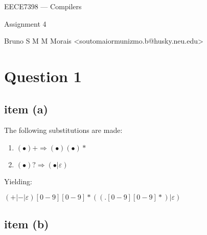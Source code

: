 \documentclass[10pt]{article}
\begin{document}
\begin{center}
\huge EECE7398 --- Compilers

Assignment 4

\vskip1cm

\normalsize\ttfamily Bruno S M M Morais <soutomaiormunizmo.b@husky.neu.edu>


\end{center}

\vskip1cm

\section*{Question 1}
\subsection*{item (a)}

\large

The following substitutions are made:

\begin{enumerate}
\item $(\bullet)+ \Rightarrow (\bullet)(\bullet)*$
\item $(\bullet)? \Rightarrow (\bullet | \varepsilon)$
\end{enumerate}

Yielding:

$\left( +|-| \varepsilon \right) [0-9][0-9]* ((.[0-9][0-9]*)|\varepsilon)$

\subsection*{item (b)}
\end{document}
